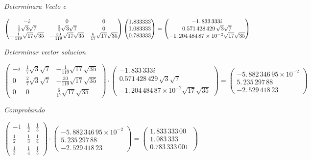\documentclass{article}
\begin{document}
\bigskip \textit{Determinara Vecto c}

$%
\begin{pmatrix}
-i & 0 & 0 \\ 
\frac{1}{7}\sqrt{3}\sqrt{7} & \frac{2}{7}\sqrt{3}\sqrt{7} & 0 \\ 
-\frac{1}{119}\sqrt{17}\sqrt{35} & -\frac{30}{119}\sqrt{17}\sqrt{35} & \frac{%
6}{17}\sqrt{17}\sqrt{35}%
\end{pmatrix}%
\allowbreak 
\begin{pmatrix}
1.833333 \\ 
1.083333 \\ 
0.783333%
\end{pmatrix}%
=\allowbreak 
\begin{pmatrix}
-1.\,\allowbreak 833\,333i \\ 
0.571\,428\,429\,\allowbreak \sqrt{3}\sqrt{7} \\ 
-1.\,\allowbreak 204\,484\,87\times 10^{-2}\sqrt{17}\sqrt{35}%
\end{pmatrix}%
\allowbreak $

\bigskip \textit{Determinar vector solucion}

$%
\begin{pmatrix}
-i & \frac{1}{7}\sqrt{3}\sqrt{7} & -\frac{1}{119}\sqrt{17}\sqrt{35} \\ 
0 & \frac{2}{7}\sqrt{3}\sqrt{7} & -\frac{30}{119}\sqrt{17}\sqrt{35} \\ 
0 & 0 & \frac{6}{17}\sqrt{17}\sqrt{35}%
\end{pmatrix}%
\cdot \allowbreak 
\begin{pmatrix}
-1.\,\allowbreak 833\,333i \\ 
0.571\,428\,429\,\allowbreak \sqrt{3}\sqrt{7} \\ 
-1.\,\allowbreak 204\,484\,87\times 10^{-2}\sqrt{17}\sqrt{35}%
\end{pmatrix}%
\allowbreak =\allowbreak 
\begin{pmatrix}
-5.\,\allowbreak 882\,346\,95\times 10^{-2} \\ 
5.\,\allowbreak 235\,297\,88 \\ 
-2.\,\allowbreak 529\,418\,23%
\end{pmatrix}%
\allowbreak $

\bigskip \textit{Comprobando}

$%
\begin{pmatrix}
-1 & \frac{1}{2} & \frac{1}{3} \\ 
\frac{1}{2} & \frac{1}{3} & \frac{1}{4} \\ 
\frac{1}{3} & \frac{1}{4} & \frac{1}{5}%
\end{pmatrix}%
\cdot 
\begin{pmatrix}
-5.\,\allowbreak 882\,346\,95\times 10^{-2} \\ 
5.\,\allowbreak 235\,297\,88 \\ 
-2.\,\allowbreak 529\,418\,23%
\end{pmatrix}%
\allowbreak =\allowbreak 
\begin{pmatrix}
1.\,\allowbreak 833\,333\,00 \\ 
1.\,\allowbreak 083\,333 \\ 
0.783\,333\,001\,\allowbreak 
\end{pmatrix}%
\allowbreak $
\end{document}
